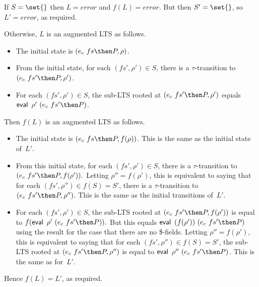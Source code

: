 If $S = \set{}$ then $L = error$ and $f(L) = error$.  But then $S' =
\set{}$, so $L' = error$, as required. 

Otherwise, $L$ is an augmented LTS as follows.
\begin{itemize}
\item The initial state is $(e_c~fs \then P, \rho)$.

\item From the initial state, for each $(fs',\rho') \in S$, there is a
  $\tau$-transition to $(e_c~fs' \then P, \rho')$.

\item For each $(fs',\rho') \in S$, the sub-LTS rooted at
  $(e_c~fs' \then P, \rho')$ equals $\eval~\rho'~(e_c~fs' \then P)$.
\end{itemize}

%
Then $f(L)$ is an augmented LTS as follows.
\begin{itemize}
\item The initial state is
  $(e_c~fs \then P, f(\rho))$.  This is the
  same as the initial state of~$L'$.

\item From this initial state, for each $(fs',\rho') \in S$, there is a
  $\tau$-transition to
  \(
  (e_c~fs' \then P, f(\rho')). 
  \)
  Letting $\rho'' = f(\rho')$, this is equivalent to
  saying that for each $(fs',\rho'') \in f(S) = S'$, there is a
  $\tau$-transition to $(e_c~fs' \then P,\linebreak[1] \rho'')$.
  This is the same as the initial transitions of~$L'$.

\item For each $(fs',\rho') \in S$, the sub-LTS rooted at
  $(e_c~fs' \then  P,\linebreak[2]
    {f(\rho')})$ is 
  equal to 
  \( f(\eval~\rho'~(e_c~fs' \then P)) . \)
  But this equals $\eval~{(f(\rho'))} ~ (e_c~fs' \then P)$
  using the result for the case that there are no \$-fields.
  Letting 
  $\rho'' = f(\rho')$, this is equivalent to saying that for each
  $(fs',\rho'') \in f(S) = S'$, the sub-LTS rooted at
  $(e_c~fs' \then P, \linebreak[2] \rho'')$ is equal to
  $\eval~\rho''~(e_c~fs' \then P)$.  This is the same as for~$L'$.
\end{itemize}
%
Hence $f(L) = L'$, as required.



